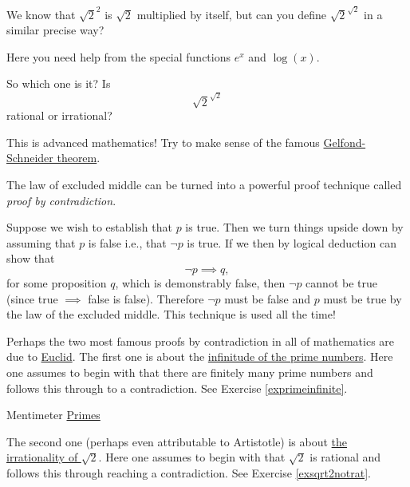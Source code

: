 \begin{exercise}
  We know that $\sqrt{2}^2$ is $\sqrt{2}$ multiplied by itself, but can you define $\sqrt{2}^{\sqrt{2}}$ in a similar
  precise way?

  \begin{hint}
    Here you need help from the special functions $e^x$ and $\log(x)$.
  \end{hint}
\end{exercise}

\begin{exercise}
  So which one is it? Is
  $$
    \sqrt{2}^{\sqrt{2}}
  $$
  rational or irrational?

  \begin{hint}
    This is advanced mathematics! Try to make sense of the famous
    \href{https://en.wikipedia.org/wiki/Gelfond\%E2\%80\%93Schneider\_theorem}{Gelfond-Schneider theorem}.
  \end{hint}
\end{exercise}

The law of excluded middle can be turned
into a powerful proof technique called \emph{proof by contradiction}.

Suppose we wish to establish that $p$ is true. Then we turn things upside down by
assuming that $p$ is false i.e., that $\neg p$ is true. If we then
by logical deduction can show that
$$
  \neg p \implies q,
$$
for some proposition $q$, which is demonstrably false, then $\neg p$ cannot be true (since
true $\implies$ false is false). Therefore $\neg p$
must be false and $p$ must be true by the law of the excluded middle. This technique is used all the time!

Perhaps the two most famous proofs by contradiction in all of mathematics are due to \href{https://en.wikipedia.org/wiki/Euclid}{Euclid}. The first one is about the \href{https://en.wikipedia.org/wiki/Euclid\%27s\_theorem}{infinitude of the prime
  numbers}.
Here one assumes to begin with that
there are finitely many prime numbers and follows this through to a contradiction.
See Exercise \ref{exprimeinfinite}.

\begin{button}{Mentimeter}
  \href{https://www.mentimeter.com/s/c261a0a0358a50b2add3a4abf730122b/3e9b4eb2fe87}{Primes}
\end{button}

The second
one (perhaps even attributable to Artistotle) is about \href{https://en.wikipedia.org/wiki/Square\_root\_of\_2#Proof\_by\_infinite\_descent}{the irrationality of $\sqrt{2}$}. Here one assumes to begin with
that $\sqrt{2}$ is rational and follows this through reaching a contradiction. See
Exercise \ref{exsqrt2notrat}.

